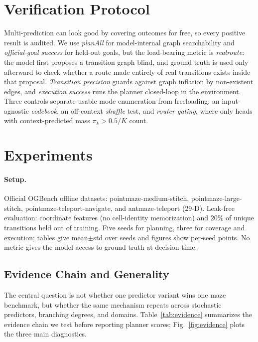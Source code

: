 \documentclass[letterpaper]{article}
\begin{document}
\section{Verification Protocol}

Multi-prediction can look good by covering outcomes for free, so every positive result is audited. We use
\emph{planAll} for model-internal graph searchability and \emph{official-goal success} for held-out goals,
but the load-bearing metric is \emph{realroute}: the model first proposes a transition graph blind, and
ground truth is used only afterward to check whether a route made entirely of real transitions exists
inside that proposal. \emph{Transition precision} guards against graph inflation by non-existent edges, and
\emph{execution success} runs the planner closed-loop in the environment. Three controls separate usable
mode enumeration from freeloading: an input-agnostic \emph{codebook}, an off-context \emph{shuffle} test,
and \emph{router gating}, where only heads with context-predicted mass $\pi_k>0.5/K$ count.

\section{Experiments}

\paragraph{Setup.}
Official OGBench offline datasets: pointmaze-medium-stitch, pointmaze-large-stitch,
pointmaze-teleport-navigate, and antmaze-teleport (29-D). Leak-free evaluation: coordinate features (no
cell-identity memorization) and $20\%$ of unique transitions held out of training. Five seeds for
planning, three for coverage and execution; tables give mean$\pm$std over seeds and figures show per-seed
points. No metric gives the model access to ground truth at decision time.

\subsection{Evidence Chain and Generality}

The central question is not whether one predictor variant wins one maze benchmark, but whether the same
mechanism repeats across stochastic predictors, branching degrees, and domains. Table~\ref{tab:evidence}
summarizes the evidence chain we test before reporting planner scores; Fig.~\ref{fig:evidence} plots the
three main diagnostics.
\end{document}
